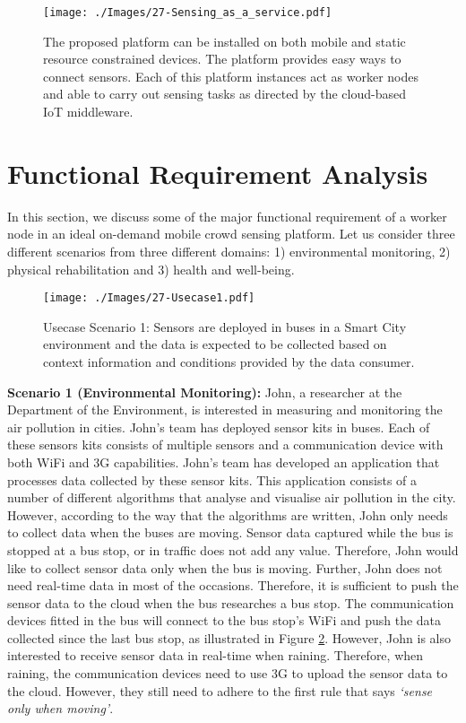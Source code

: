 \documentclass[journal]{IEEEtran}
\begin{document}
\begin{figure}[t]
 \centering
\texttt{[image: ./Images/27-Sensing\_as\_a\_service.pdf]}
\caption{The proposed platform can be installed on both mobile and static resource constrained devices. The platform provides easy ways to connect sensors. Each of this platform instances act as worker nodes and able to carry out sensing tasks as directed by the cloud-based IoT middleware.}
 \label{Figure:Sensing_as_a_service}	
\end{figure}


\section{Functional Requirement Analysis}
\label{sec:Functional}

In this section, we discuss some of the major functional requirement of a worker node in an ideal on-demand mobile crowd sensing platform. Let us consider three different scenarios from three different domains: 1) environmental monitoring, 2) physical rehabilitation  and 3) health and well-being.



\begin{figure}[b]
 \centering
\texttt{[image: ./Images/27-Usecase1.pdf]}
\caption{Usecase Scenario 1: Sensors are deployed in buses in a Smart City environment and the data is expected to be collected based on context information and conditions provided by the data consumer.}
 \label{Figure:Usecase1}	
\end{figure}

\textbf{Scenario 1 (Environmental Monitoring):} John, a researcher at the Department of the Environment, is interested in measuring and monitoring the air pollution in cities. John's team has deployed sensor kits in buses. Each of these sensors kits consists of multiple sensors and a communication device with both WiFi and 3G capabilities. John's team has developed an application that processes data collected by these sensor kits. This application consists of a number of different algorithms that analyse and visualise air pollution in the city. However, according to the way that the  algorithms are written, John only needs to collect data when the buses are moving. Sensor data captured while the bus is stopped at a bus stop, or in traffic does not add any value. Therefore, John would like to collect sensor data only when the bus is moving. Further, John does not need real-time data in most of the occasions. Therefore,  it is sufficient to push the  sensor data to the cloud when the bus researches a bus stop. The communication devices fitted in the bus will connect to the bus stop's WiFi and push the data collected since the last bus stop, as illustrated in Figure \ref{Figure:Usecase1}. However, John is also interested to receive sensor data in real-time when raining. Therefore, when raining, the communication devices need to use 3G to upload the sensor data to the cloud. However, they still need to adhere to the first rule  that says \textit{`sense only when moving'}.
\end{document}

